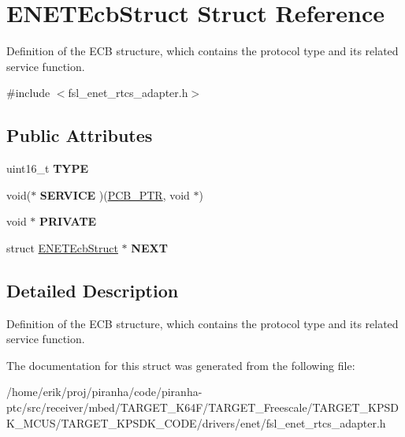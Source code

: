 \hypertarget{structENETEcbStruct}{}\section{E\+N\+E\+T\+Ecb\+Struct Struct Reference}
\label{structENETEcbStruct}


Definition of the E\+CB structure, which contains the protocol type and it\textquotesingle{}s related service function.  




{\ttfamily \#include $<$fsl\+\_\+enet\+\_\+rtcs\+\_\+adapter.\+h$>$}

\subsection*{Public Attributes}
\begin{DoxyCompactItemize}
\item 
uint16\+\_\+t {\bfseries T\+Y\+PE}\hypertarget{structENETEcbStruct_aa9eb09b187e5898aa6f35e19ac883c77}{}\label{structENETEcbStruct_aa9eb09b187e5898aa6f35e19ac883c77}

\item 
void($\ast$ {\bfseries S\+E\+R\+V\+I\+CE} )(\hyperlink{structpcb}{P\+C\+B\+\_\+\+P\+TR}, void $\ast$)\hypertarget{structENETEcbStruct_a85e2391ddf974fe9bae922695d943d9f}{}\label{structENETEcbStruct_a85e2391ddf974fe9bae922695d943d9f}

\item 
void $\ast$ {\bfseries P\+R\+I\+V\+A\+TE}\hypertarget{structENETEcbStruct_a3335df0c3b446b34134558c77e2f7675}{}\label{structENETEcbStruct_a3335df0c3b446b34134558c77e2f7675}

\item 
struct \hyperlink{structENETEcbStruct}{E\+N\+E\+T\+Ecb\+Struct} $\ast$ {\bfseries N\+E\+XT}\hypertarget{structENETEcbStruct_ab2b4e11a79675fc54253632a7c4a4454}{}\label{structENETEcbStruct_ab2b4e11a79675fc54253632a7c4a4454}

\end{DoxyCompactItemize}


\subsection{Detailed Description}
Definition of the E\+CB structure, which contains the protocol type and it\textquotesingle{}s related service function. 

The documentation for this struct was generated from the following file\+:\begin{DoxyCompactItemize}
\item 
/home/erik/proj/piranha/code/piranha-\/ptc/src/receiver/mbed/\+T\+A\+R\+G\+E\+T\+\_\+\+K64\+F/\+T\+A\+R\+G\+E\+T\+\_\+\+Freescale/\+T\+A\+R\+G\+E\+T\+\_\+\+K\+P\+S\+D\+K\+\_\+\+M\+C\+U\+S/\+T\+A\+R\+G\+E\+T\+\_\+\+K\+P\+S\+D\+K\+\_\+\+C\+O\+D\+E/drivers/enet/fsl\+\_\+enet\+\_\+rtcs\+\_\+adapter.\+h\end{DoxyCompactItemize}
